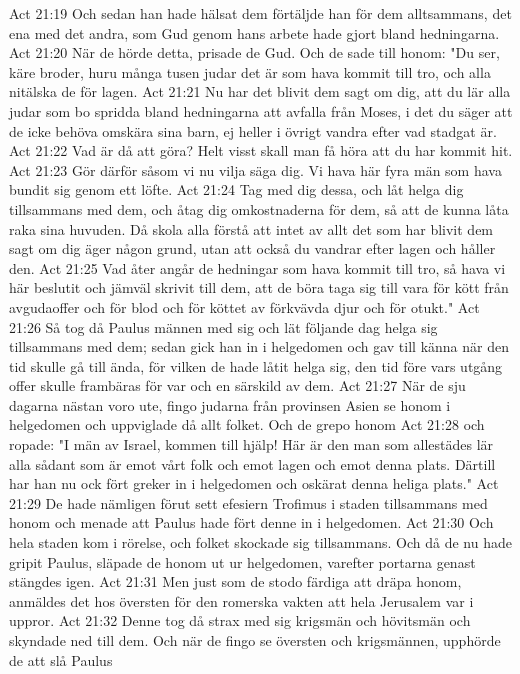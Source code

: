 Act 21:19  Och sedan han hade hälsat dem förtäljde han för dem alltsammans, det ena med det andra, som Gud genom hans arbete hade gjort bland hedningarna.
Act 21:20  När de hörde detta, prisade de Gud. Och de sade till honom: "Du ser, käre broder, huru många tusen judar det är som hava kommit till tro, och alla nitälska de för lagen.
Act 21:21  Nu har det blivit dem sagt om dig, att du lär alla judar som bo spridda bland hedningarna att avfalla från Moses, i det du säger att de icke behöva omskära sina barn, ej heller i övrigt vandra efter vad stadgat är.
Act 21:22  Vad är då att göra? Helt visst skall man få höra att du har kommit hit.
Act 21:23  Gör därför såsom vi nu vilja säga dig. Vi hava här fyra män som hava bundit sig genom ett löfte.
Act 21:24  Tag med dig dessa, och låt helga dig tillsammans med dem, och åtag dig omkostnaderna för dem, så att de kunna låta raka sina huvuden. Då skola alla förstå att intet av allt det som har blivit dem sagt om dig äger någon grund, utan att också du vandrar efter lagen och håller den.
Act 21:25  Vad åter angår de hedningar som hava kommit till tro, så hava vi här beslutit och jämväl skrivit till dem, att de böra taga sig till vara för kött från avgudaoffer och för blod och för köttet av förkvävda djur och för otukt."
Act 21:26  Så tog då Paulus männen med sig och lät följande dag helga sig tillsammans med dem; sedan gick han in i helgedomen och gav till känna när den tid skulle gå till ända, för vilken de hade låtit helga sig, den tid före vars utgång offer skulle frambäras för var och en särskild av dem.
Act 21:27  När de sju dagarna nästan voro ute, fingo judarna från provinsen Asien se honom i helgedomen och uppviglade då allt folket. Och de grepo honom
Act 21:28  och ropade: "I män av Israel, kommen till hjälp! Här är den man som allestädes lär alla sådant som är emot vårt folk och emot lagen och emot denna plats. Därtill har han nu ock fört greker in i helgedomen och oskärat denna heliga plats."
Act 21:29  De hade nämligen förut sett efesiern Trofimus i staden tillsammans med honom och menade att Paulus hade fört denne in i helgedomen.
Act 21:30  Och hela staden kom i rörelse, och folket skockade sig tillsammans. Och då de nu hade gripit Paulus, släpade de honom ut ur helgedomen, varefter portarna genast stängdes igen.
Act 21:31  Men just som de stodo färdiga att dräpa honom, anmäldes det hos översten för den romerska vakten att hela Jerusalem var i uppror.
Act 21:32  Denne tog då strax med sig krigsmän och hövitsmän och skyndade ned till dem. Och när de fingo se översten och krigsmännen, upphörde de att slå Paulus
